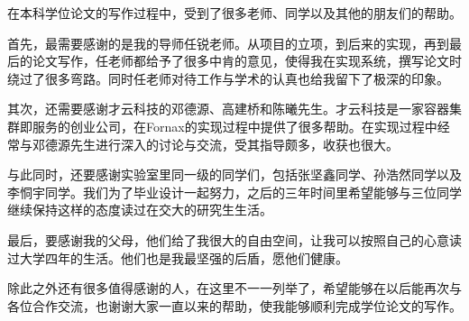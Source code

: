 \begin{thanks}

在本科学位论文的写作过程中，受到了很多老师、同学以及其他的朋友们的帮助。

首先，最需要感谢的是我的导师任锐老师。从项目的立项，到后来的实现，再到最后的论文写作，任老师都给予了很多中肯的意见，使得我在实现系统，撰写论文时绕过了很多弯路。同时任老师对待工作与学术的认真也给我留下了极深的印象。

其次，还需要感谢才云科技的邓德源、高建桥和陈曦先生。才云科技是一家容器集群即服务的创业公司，在Fornax的实现过程中提供了很多帮助。在实现过程中经常与邓德源先生进行深入的讨论与交流，受其指导颇多，收获也很大。

与此同时，还要感谢实验室里同一级的同学们，包括张坚鑫同学、孙浩然同学以及李恫宇同学。我们为了毕业设计一起努力，之后的三年时间里希望能够与三位同学继续保持这样的态度读过在交大的研究生生活。

最后，要感谢我的父母，他们给了我很大的自由空间，让我可以按照自己的心意读过大学四年的生活。他们也是我最坚强的后盾，愿他们健康。

除此之外还有很多值得感谢的人，在这里不一一列举了，希望能够在以后能再次与各位合作交流，也谢谢大家一直以来的帮助，使我能够顺利完成学位论文的写作。

\end{thanks}
